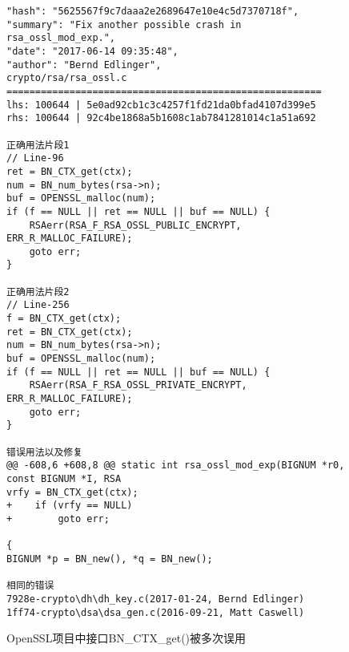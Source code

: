 \begin{figure}[t]
	\centering
\begin{lstlisting}
"hash": "5625567f9c7daaa2e2689647e10e4c5d7370718f",
"summary": "Fix another possible crash in rsa_ossl_mod_exp.",
"date": "2017-06-14 09:35:48",
"author": "Bernd Edlinger",
crypto/rsa/rsa_ossl.c
=======================================================
lhs: 100644 | 5e0ad92cb1c3c4257f1fd21da0bfad4107d399e5
rhs: 100644 | 92c4be1868a5b1608c1ab7841281014c1a51a692

正确用法片段1
// Line-96
ret = BN_CTX_get(ctx);
num = BN_num_bytes(rsa->n);
buf = OPENSSL_malloc(num);
if (f == NULL || ret == NULL || buf == NULL) {
	RSAerr(RSA_F_RSA_OSSL_PUBLIC_ENCRYPT, ERR_R_MALLOC_FAILURE);
	goto err;
}

正确用法片段2
// Line-256
f = BN_CTX_get(ctx);
ret = BN_CTX_get(ctx);
num = BN_num_bytes(rsa->n);
buf = OPENSSL_malloc(num);
if (f == NULL || ret == NULL || buf == NULL) {
	RSAerr(RSA_F_RSA_OSSL_PRIVATE_ENCRYPT, ERR_R_MALLOC_FAILURE);
	goto err;
}

错误用法以及修复
@@ -608,6 +608,8 @@ static int rsa_ossl_mod_exp(BIGNUM *r0, const BIGNUM *I, RSA 
vrfy = BN_CTX_get(ctx);
+    if (vrfy == NULL)
+        goto err;

{
BIGNUM *p = BN_new(), *q = BN_new();

相同的错误
7928e-crypto\dh\dh_key.c(2017-01-24, Bernd Edlinger)
1ff74-crypto\dsa\dsa_gen.c(2016-09-21, Matt Caswell)
\end{lstlisting}
	\caption{
	OpenSSL项目中接口BN\_CTX\_get()被多次误用
	}
	\label{fig:2-3-dul}
\end{figure}